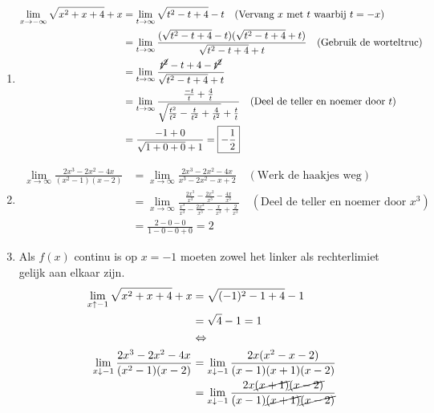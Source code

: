\documentclass{article}
\begin{document}
\begin{enumerate}
\begin{enumerate}[label=\alph*)]
            
        \item
            \begin{align*}
                \lim_{x \rightarrow -\infty} \sqrt{x^2+x+4} + x &= \lim_{t \rightarrow \infty} \sqrt{t^2-t+4}-t \quad (\text{Vervang $x$ met $t$ waarbij $t=-x$})\\
                &= \lim_{t \rightarrow \infty} \frac{(\sqrt{t^2-t+4}-t)(\sqrt{t^2-t+4}+t)}{\sqrt{t^2-t+4}+t} \quad (\text{Gebruik de worteltruc})\\ 
                &= \lim_{t \rightarrow \infty} \frac{\cancel{t^2}-t+4-\cancel{t^2}}{\sqrt{t^2-t+4}+t} \\
                &= \lim_{t \rightarrow \infty} \frac{\frac{-t}{t}+\frac{4}{t}}{\sqrt{\frac{t^2}{t^2}-\frac{t}{t^2}+\frac{4}{t^2}} + \frac{t}{t}} \quad (\text{Deel de teller en noemer door $t$})\\
                &= \frac{-1 + 0}{\sqrt{1+0+0}+1} = \boxed{-\frac{1}{2}}
            \end{align*}
        \item
            \begin{align*}
                \lim_{x \rightarrow \infty} \frac{2x^3-2x^2-4x}{(x^2-1)(x-2)} &= \lim_{x \rightarrow \infty} \frac{2x^3-2x^2-4x}{x^3-2x^2-x+2} \quad (\text{Werk de haakjes weg}) \\
                &= \lim_{x \rightarrow \infty} \frac{\frac{2x^3}{x^3}-\frac{2x^2}{x^3}-\frac{4x}{x^3}}{\frac{x^3}{x^3}-\frac{2x^2}{x^3}-\frac{x}{x^3}+\frac{2}{x^3}} \quad (\text{Deel de teller en noemer door $x^3$})\\
                &= \frac{2-0-0}{1-0-0+0} = \boxed{2}
            \end{align*}
        \item
            Als $f(x)$ continu is op $x=-1$ moeten zowel het linker als rechterlimiet gelijk aan elkaar zijn. 
            \begin{align*}
                \lim_{x \uparrow -1} \sqrt{x^2+x+4}+x &= \sqrt{(-1)^2-1+4}-1 \\
                &= \sqrt{4} - 1 = 1 \\
                &\Leftrightarrow \\
                \lim_{x \downarrow -1} \frac{2x^3-2x^2-4x}{(x^2-1)(x-2)} &= \lim_{x \downarrow -1} \frac{2x(x^2-x-2)}{(x-1)(x+1)(x-2)} \\
                &= \lim_{x \downarrow -1} \frac{2x\cancel{(x+1)}\cancel{(x-2)}}{(x-1)\cancel{(x+1)}\cancel{(x-2)}} \\

\end{align*}
\end{enumerate}
\end{enumerate}
\end{document}
